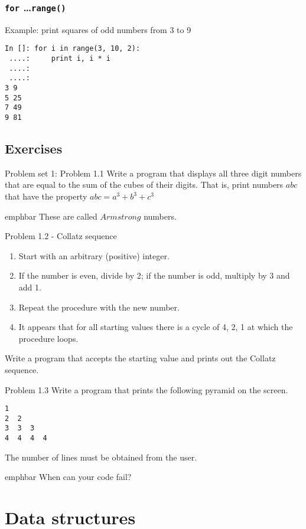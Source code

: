 \documentclass[14pt,compress]{beamer}
\newcommand{\emphbar}[1]
{\begin{beamercolorbox}[rounded=true]{emphbar} 
      {#1}
 \end{beamercolorbox}
}
\newcounter{time}
\newcommand{\inctime}[1]{\addtocounter{time}{#1}{\tiny \thetime\ m}}
\newcommand{\typ}[1]{\texttt{#1}}
\begin{document}
\begin{frame}[fragile]
  \frametitle{\typ{for} \ldots \typ{range()}}
Example: print squares of odd numbers from 3 to 9
  \begin{lstlisting}
In []: for i in range(3, 10, 2):
 ....:     print i, i * i
 ....:
 ....:
3 9
5 25
7 49
9 81
\end{lstlisting}
\inctime{5}
\end{frame}

\subsection{Exercises}

\begin{frame}{Problem set 1: Problem 1.1}
  Write a program that displays all three digit numbers that are equal to the sum of the cubes of their digits. That is, print numbers $abc$ that have the property $abc = a^3 + b^3 + c^3$\\
\vspace*{0.2in}
\emphbar{These are called $Armstrong$ numbers.}
\end{frame}

\begin{frame}{Problem 1.2 - Collatz sequence}
\begin{enumerate}
  \item Start with an arbitrary (positive) integer. 
  \item If the number is even, divide by 2; if the number is odd, multiply by 3 and add 1.
  \item Repeat the procedure with the new number.
  \item It appears that for all starting values there is a cycle of 4, 2, 1 at which the procedure loops.
\end{enumerate}
    Write a program that accepts the starting value and prints out the Collatz sequence.
\end{frame}

\begin{frame}[fragile]{Problem 1.3}
  Write a program that prints the following pyramid on the screen. 
  \begin{lstlisting}
1
2  2
3  3  3
4  4  4  4
  \end{lstlisting}
The number of lines must be obtained from the user.\\
\pause
\emphbar{When can your code fail?}
\inctime{5}
\end{frame}

\section{Data structures}
\end{document}
